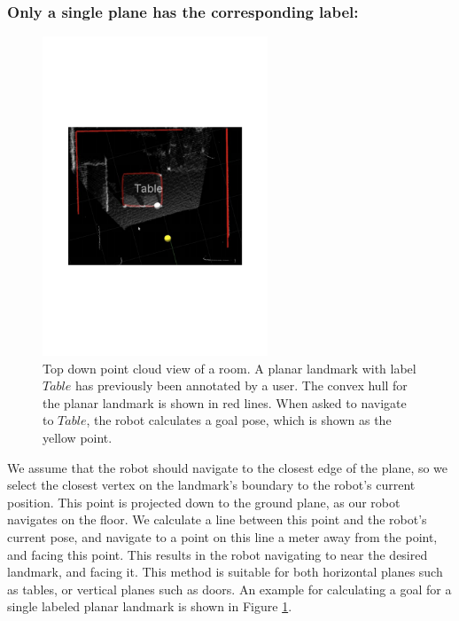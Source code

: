 \subsubsection{Only a single plane has the corresponding label: }
\label{sec:navigation_goal_single_label}

\begin{figure}[ht!]
\centering
\includegraphics[width=0.6\textwidth]{pics/single_plane}
\caption{Top down point cloud view of a room. A planar landmark with label $Table$ has previously been annotated by a user. The convex hull for the planar landmark is shown in red lines. When asked to navigate to $Table$, the robot calculates a goal pose, which is shown as the yellow point.}
\label{fig:single_plane}
\end{figure}

We assume that the robot should navigate to the closest edge of the plane, so we select the closest vertex on the landmark's boundary to the robot's current position. This point is projected down to the ground plane, as our robot navigates on the floor. We calculate a line between this point and the robot's current pose, and navigate to a point on this line a meter away from the point, and facing this point. This results in the robot navigating to near the desired landmark, and facing it. This method is suitable for both horizontal planes such as tables, or vertical planes such as doors. An example for calculating a goal for a single labeled planar landmark is shown in Figure \ref{fig:single_plane}. 

